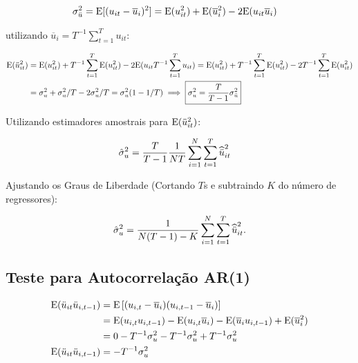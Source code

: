 \documentclass[11pt, oneside, a4paper, article]{article}
\numberwithin{equation}{section}
\begin{document}
\vspace{-1 em} 
\begin{align*}
\sigma^{2}_{\ddot{u}} &=
\text{E}[ ( u_{it} - \overline{u}_{i})^2] = 
\text{E}( u_{it}^2) + \text{E}( \overline{u}_{i}^2) - 2 \text{E}( u_{it} \overline{u}_{i})
\end{align*}

\noindent
utilizando $\overline{u}_{i} = T^{-1} \sum_{t=1}^{T} u_{it}$:

\vspace{-1 em} 
\begin{align*}
\text{E}( \ddot{u}_{it}^2) 
&=
\text{E}( u_{it}^2) + T^{-1} \sum_{t=1}^{T} \text{E}( u_{it}^2) - 2 \text{E}( u_{it} T^{-1} \sum_{t=1}^{T} u_{it})
= 
\text{E}( u_{it}^2) + T^{-1} \sum_{t=1}^{T} \text{E}( u_{it}^2) - 2T^{-1} \sum_{t=1}^{T} \text{E}( u^2_{it})
\\
&= 
\sigma^2_{u} + \sigma^2_{u}/T - 2\sigma^2_{u}/T = \sigma^2_{u}(1 - 1/T)
\implies
\boxed{\sigma^2_{u} = \frac{T}{T-1} \sigma^2_{\ddot{u}} }
\end{align*}

\noindent
Utilizando estimadores amostrais para $\text{E}(\ddot{u}_{it}^{2})$:

\vspace{-1 em} 
\begin{align*}
\hat{\sigma}_{u}^2
&= 
\frac{T}{T-1} \frac{1}{NT}
\sum_{i=1}^{N} \sum_{t=1}^{T}  
\widehat{\ddot{u}}_{it}^2
\end{align*}

\noindent
Ajustando os Graus de Liberdade (Cortando $T$s e subtraindo $K$ do número de regressores):

\vspace{-1 em} 
\begin{align}\label{fe:sighat}
\hat{\sigma}^2_{u} = \frac{1}{N(T-1) - K}
\sum_{i=1}^{N} \sum_{t=1}^{T} \widehat{\ddot{u}}^2_{it}.
\end{align}

\subsection*{Teste para Autocorrelação AR(1)}
\noindent
\citet[p.275]{wool-2010}

\vspace{-1 em} 
\begin{align*}
	\text{E}( \ddot{u}_{it} \ddot{u}_{i,t-1} ) &=
	\text{E}\left[ ( u_{i,t} - \overline{u}_{i} ) ( u_{i,t-1} - \overline{u}_{i} ) \right]
	\\
	&=
	\text{E}( u_{i,t} u_{i,t-1} ) - 
	\text{E}( u_{i,t} \overline{u}_{i} ) -
	\text{E}( \overline{u}_{i} u_{i,t-1} ) +
	\text{E}( \overline{u}^2_{i} )
	\\
	&=
	0 - T^{-1} \sigma^2_{u} - T^{-1} \sigma^2_{u} + T^{-1} \sigma^2_{u}
	\\
	\text{E}( \ddot{u}_{it} \ddot{u}_{i,t-1} ) 
	&= -T^{-1} \sigma_{u}^2
\end{align*}
\end{document}
